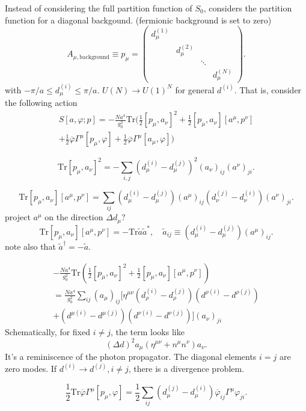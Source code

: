 Instead of considering the full partition function of $S_0$,
 considers the partition function for a diagonal backgound.
(fermionic background is set to zero)
\[
	A_{\mu,\text{background}} \equiv p_\mu =
	\begin{pmatrix}
		d_\mu^{(1)} & ~ & ~ & ~ \\
		~ & d_\mu^{(2)} & ~ & ~ \\
		~ & ~ & \ddots & ~ \\
		~ & ~ & ~ & d_\mu^{(N)}
	\end{pmatrix}
.\] 
with $ - \pi /a \leq d_\mu^{(i)} \leq \pi / a$.
$U(N)\to U(1)^N$ for general $d^{(i)}$.
That is, consider the following action
\begin{align*}
	S[a,\varphi;p] = - \frac{N a^4}{g_0^2}
	\mathrm{Tr} \bigg( \frac{1}{2} [p_\mu,a_\nu]^2 + 
	\frac{1}{2} [p_\mu,a_\nu][a^\mu,p^\nu]
\\
+ \frac{1}{2} \overline{\varphi} \Gamma^\mu [p_\mu,\varphi]
+ \frac{1}{2} \overline{\varphi} \Gamma^\mu [a_\mu,\varphi]\bigg)
\end{align*}

\[
	\mathrm{Tr} [p_\mu,a_\nu]^2 = 
	- \sum_{i,j} (d_\mu^{(i)} - d_\mu^{(j)})^2 (a_\nu)_{ij} (a^\nu)_{ji}
.\] 

\[
	\mathrm{Tr}[p_\mu,a_\nu][a^\mu,p^\nu]
	= \sum_{ij} (d_\mu^{(i)} - d_\mu^{(j)}) (a^\mu)_{ij}
	(d_\nu^{(j)} - d_\nu^{(i)}) (a^\nu)_{ji}
.\] 
project $a^\mu$ on the direction $\Delta d_\mu$?
\[
	\mathrm{Tr}[p_\mu,a_\nu][a^\mu,p^\nu]
	=- \mathrm{Tr} \tilde{a} \tilde{a}^*,\quad
	\tilde{a}_{ij} \equiv (d_\mu^{(i)} - d_\mu^{(j)}) (a^\mu)_{ij}
.\] 
note also that $\tilde{a}^\dagger = - \tilde{a}$.

\begin{gather*}
	- \frac{N a^4}{g_0^2}
	\mathrm{Tr} \left( \frac{1}{2} [p_\mu,a_\nu]^2 + 
	\frac{1}{2} [p_\mu,a_\nu][a^\mu,p^\nu] \right)
	\\
	=\frac{N a^4}{g_0^2} \sum_{ij}
	(a_\mu)_{ij} 
	\bigg[ \eta^{\mu\nu} (d_\rho^{(i)} - d_{\rho}^{(j)}) (d^{\rho (i)} - d^{\rho(j)}) \\
	+ (d^{\mu(i)} - d^{\mu (j)}) (d^{\nu (i)} - d^{\nu (j)})\bigg]
	(a_\nu)_{ji}
\end{gather*}
Schematically, for fixed $i\neq j$, the term looks like
\[
	(\Delta d)^2 a_\mu (\eta^{\mu\nu} + n^\mu n^\nu) a_\nu
.\] 
It's a reminiscence of the photon propagator.
The diagonal elements $i=j$ are zero modes.
If $d^{(i)} \to d^{(j)},i\neq j$, there is a divergence problem.

\begin{equation}
	\frac{1}{2}\mathrm{Tr} \overline{\varphi}\Gamma^\mu [p_\mu,\varphi]
	= \frac{1}{2} \sum_{ij} (d_\mu^{(j)} - d_\mu^{(i)})
	\overline{\varphi}_{ij} \Gamma^\mu \varphi_{ji}.
\end{equation}

